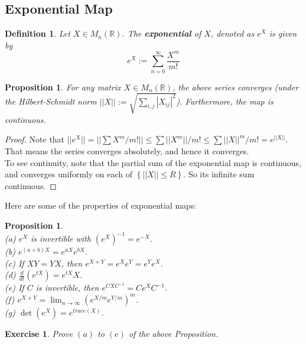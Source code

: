 \documentclass[11pt]{article}
\newtheorem{proposition}[theorem]{Proposition}
\newtheorem{exercise}[theorem]{Exercise}
\newtheorem{definition}[theorem]{Definition}
\newcommand{\bb}[1]{\mathbb{#1}}
\begin{document}
\subsection{Exponential Map}
\begin{definition}
Let $X \in M_n(\bb{R})$. The \textbf{exponential} of $X$, denoted as $e^X$ is given by
$$e^X := \sum_{n = 0}^{\infty} \frac{X^m}{m!}$$
\end{definition}

\begin{proposition}
For any matrix $X \in M_n(\bb{R})$, the above series converges (under the Hilbert-Schmidt norm $||X|| := \sqrt{\sum_{i,j}|X_{ij}|^2}$). Furthermore, the map is continuous.
\end{proposition}
\begin{proof}
Note that $||e^X|| = ||\sum X^m/m!|| \leq \sum ||X^m||/ m! \leq \sum ||X||^m/m! = e^{||X||}$. That means the series converges absolutely, and hence it converges.\\
To see continuity, note that the partial sum of the exponential map is continuous, and converges uniformly on each of $\left\{||X|| \leq R \right\}$. So its infinite sum continuous.
\end{proof}
Here are some of the properties of exponential maps:
\begin{proposition} \label{tracedet} \mbox{}\\
(a) $e^X$ is invertible with $(e^X)^{-1} = e^{-X}$.\\
(b) $e^{(a+b)X} = e^{aX}e^{bX}$.\\
(c) If $XY = YX$, then $e^{X+Y} = e^Xe^Y = e^Ye^X$.\\
(d) $\frac{d}{dt}(e^{tX}) = e^{tX}X$.\\
(e) If $C$ is invertible, then $e^{CXC^{-1}} = Ce^XC^{-1}$.\\
(f) $e^{X+Y} = \lim_{n \to \infty}(e^{X/m}e^{Y/m})^m$.\\
(g) $\det(e^X) = e^{trace(X)}$.
\end{proposition}
\begin{exercise}
Prove $(a)$ to $(e)$ of the above Proposition.
\end{exercise}
\end{document}
